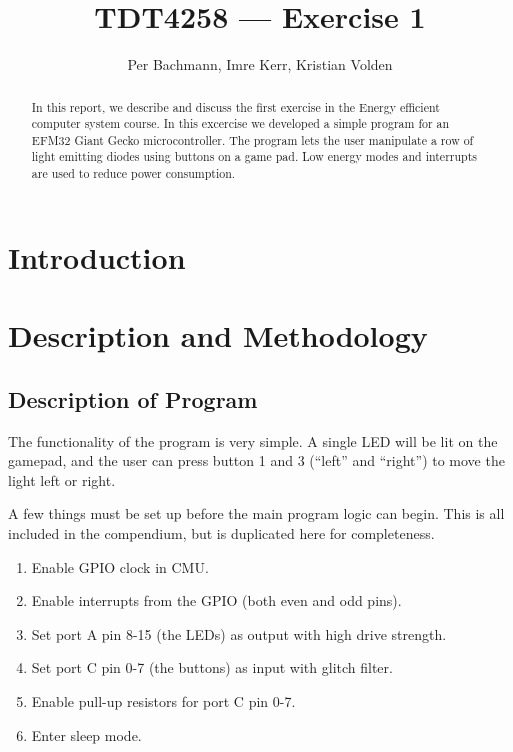 \documentclass[a4paper, 12pt]{article}
\title{TDT4258 --- Exercise 1}
\author{Per Bachmann, Imre Kerr, Kristian Volden}
\begin{document}
\maketitle
\begin{abstract}
In this report, we describe and discuss the first exercise in the Energy efficient computer system course. In this excercise we developed a simple program for an EFM32 Giant Gecko microcontroller. The program lets the user manipulate a row of light emitting diodes using buttons on a game pad. Low energy modes and interrupts are used to reduce power consumption.\end{abstract}
\section{Introduction} %
\label{sec:introduction}


\section{Description and Methodology} %
\label{sec:description_and_methodology}
    \subsection{Description of Program} %
    \label{sub:description_of_program}
        The functionality of the program is very simple. A single LED will be lit on the gamepad, and the user can press button 1 and 3 (``left'' and ``right'') to move the light left or right.

        A few things must be set up before the main program logic can begin. This is all included in the compendium, but is duplicated here for completeness.

        \begin{enumerate}
            \item Enable GPIO clock in CMU.
            \item Enable interrupts from the GPIO (both even and odd pins).
            \item Set port A pin 8-15 (the LEDs) as output with high drive strength.
            \item Set port C pin 0-7 (the buttons) as input with glitch filter.
            \item Enable pull-up resistors for port C pin 0-7.
            \item Enter sleep mode.
        \end{enumerate}
\end{document}
